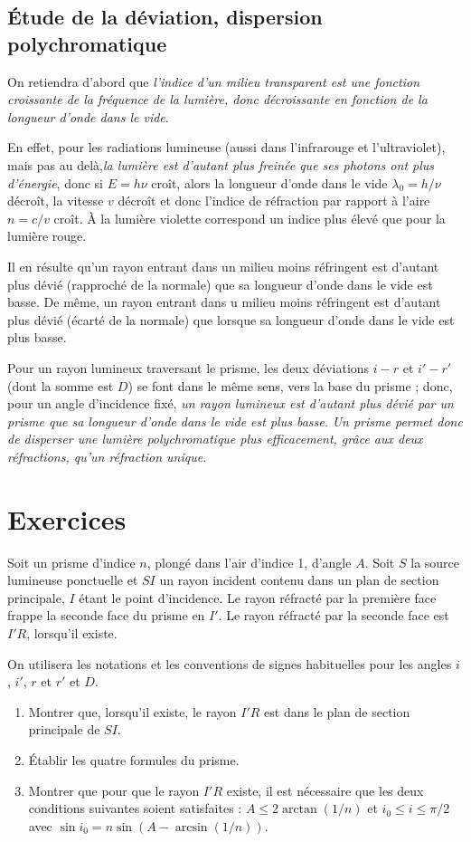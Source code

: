 \subsection{Étude de la déviation, dispersion polychromatique}

On retiendra d'abord que \emph{l'indice d'un milieu transparent est une fonction croissante de la fréquence de la lumière, donc décroissante en fonction de la longueur d'onde dans le vide}.

En effet, pour les radiations lumineuse (aussi dans l'infrarouge et l'ultraviolet), mais pas au delà,\emph{la lumière est d'autant plus freinée que ses photons ont plus d'énergie}, donc si $E=h \nu$ croît, alors la longueur d'onde dans le vide $\lambda_0 = h/\nu$ décroît, la vitesse $v$ décroît et donc l'indice de réfraction par rapport à l'aire $n=c/v$ croît. À la lumière violette correspond un indice plus élevé que pour la lumière rouge.

Il en résulte qu'un rayon entrant dans un milieu moins réfringent est d'autant plus dévié (rapproché de la normale) que sa longueur d'onde dans le vide est basse. De même, un rayon entrant dans u milieu moins réfringent est d'autant plus dévié (écarté de la normale) que lorsque sa longueur d'onde dans le vide est plus basse.

Pour un rayon lumineux traversant le prisme, les deux déviations $i-r$ et $i'-r'$ (dont la somme est $D$) se font dans le même sens, vers la base du prisme ; donc, pour un angle d'incidence fixé, \emph{un rayon lumineux est d'autant plus dévié par un prisme que sa longueur d'onde dans le vide est plus basse.}
\emph{Un prisme permet donc de disperser une lumière polychromatique plus efficacement, grâce aux deux réfractions, qu'un réfraction unique}.

\section{Exercices}

\begin{exercice}
	Soit un prisme d'indice $n$, plongé dans l'air d'indice 1, d'angle $A$.
	Soit $S$ la source lumineuse ponctuelle et $SI$ un rayon incident contenu dans un plan de section principale, $I$ étant le point d'incidence. Le rayon réfracté par la première face frappe la seconde face du prisme en $I'$. Le rayon réfracté par la seconde face est $I'R$, lorsqu'il existe.

	On utilisera les notations et les conventions de signes habituelles pour les angles $i$, $i'$, $r$ et $r'$ et $D$.
	\begin{enumerate}
\item Montrer que, lorsqu'il existe, le rayon $I'R$ est dans le plan de section principale de $SI$.
\item Établir les quatre formules du prisme.
\item Montrer que pour que le rayon $I'R$ existe, il est nécessaire que les deux conditions suivantes soient satisfaites : $A \leq 2 \arctan(1/n)$ et $i_0 \leq i \leq \pi/2$ avec $\sin i_0 = n \sin\left(A-\arcsin(1/n)\right)$.
	\end{enumerate}
\end{exercice}

